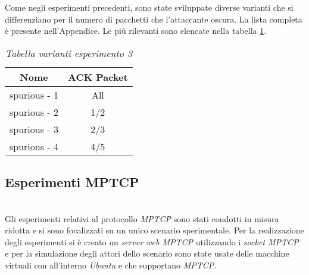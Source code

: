 Come negli esperimenti precedenti, sono state sviluppate diverse varianti che si differenziano per il numero di pacchetti che l'attaccante oscura. La lista completa è presente nell'Appendice. Le più rilevanti sono elencate nella tabella \ref{table-spurious}.
\begin{table}[!h]
    \centering
    \begin{tabular}{|c|c|}
        \hline
        \textbf{Nome} & \textbf{ACK Packet} \\
        \hline
        spurious - 1  & All \\
        \hline
        spurious - 2 & 1/2 \\
        \hline
        spurious - 3 & 2/3 \\
        \hline
        spurious - 4 & 4/5 \\
        \hline
    \end{tabular}
    \caption{\emph{Tabella varianti esperimento 3}}
    \label{table-spurious}
\end{table}
\pagebreak
\subsection{Esperimenti MPTCP}
~\\
\indent Gli esperimenti relativi al protocollo \emph{MPTCP} sono stati condotti in misura ridotta e si sono focalizzati su un unico scenario sperimentale. Per la realizzazione degli esperimenti si è creato un \emph{server web MPTCP} utilizzando i \emph{socket MPTCP} \cite{site:mptcp-code} e per la simulazione degli attori dello scenario sono state usate delle macchine virtuali con all'interno \emph{Ubuntu} e che supportano \emph{MPTCP}.

